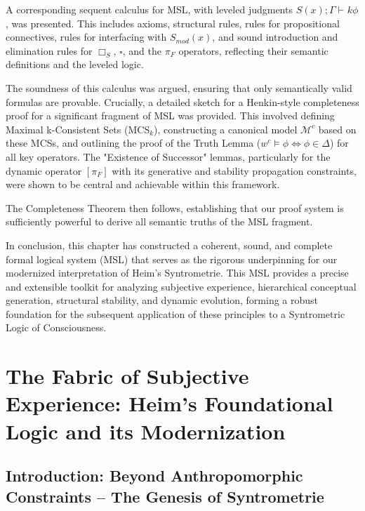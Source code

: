 \documentclass[
    12pt,              %
    a4paper,           %
    headings=normal,   %
    twoside=true,      %
    BCOR=8mm,          %
]{scrbook}
\newcommand{\Smodx}{S_{mod}(x)}
\newcommand{\BoxS}{\Box_S}
\newcommand{\BoxSyn}{\square}
\newcommand{\dynboxgen}[1]{[#1]}
\newcommand{\turnstilek}[1][]{\vdash^{#1}}
\newcommand{\MCS}{\text{MCS}}
\begin{document}
A corresponding sequent calculus for MSL, with leveled judgments \(S(x); \Gamma \turnstilek{k} \phi\), was presented. This includes axioms, structural rules, rules for propositional connectives, rules for interfacing with \(\Smodx\), and sound introduction and elimination rules for \(\BoxS\), \(\BoxSyn\), and the \(\pi_F\) operators, reflecting their semantic definitions and the leveled logic.

The soundness of this calculus was argued, ensuring that only semantically valid formulas are provable. Crucially, a detailed sketch for a Henkin-style completeness proof for a significant fragment of MSL was provided. This involved defining Maximal k-Consistent Sets (\(\MCS_k\)), constructing a canonical model \(\mathcal{M}^c\) based on these MCSs, and outlining the proof of the Truth Lemma (\(w^c \vDash \phi \iff \phi \in \Delta\)) for all key operators. The "Existence of Successor" lemmas, particularly for the dynamic operator \(\dynboxgen{\pi_F}\) with its generative and stability propagation constraints, were shown to be central and achievable within this framework.

The Completeness Theorem then follows, establishing that our proof system is sufficiently powerful to derive all semantic truths of the MSL fragment.

In conclusion, this chapter has constructed a coherent, sound, and complete formal logical system (MSL) that serves as the rigorous underpinning for our modernized interpretation of Heim's Syntrometrie. This MSL provides a precise and extensible toolkit for analyzing subjective experience, hierarchical conceptual generation, structural stability, and dynamic evolution, forming a robust foundation for the subsequent application of these principles to a Syntrometric Logic of Consciousness.

\chapter{The Fabric of Subjective Experience: Heim's Foundational Logic and its Modernization}
\label{sec:ch1_main}

\section{Introduction: Beyond Anthropomorphic Constraints – The Genesis of Syntrometrie}
\label{sec:ch1_intro_modern}
\end{document}
